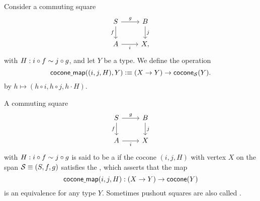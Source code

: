 \begin{defn}
Consider a commuting square
\begin{equation*}
\begin{tikzcd}
S \arrow[d,swap,"f"] \arrow[r,"g"] & B \arrow[d,"j"] \\
A \arrow[r,swap,"i"] & X,
\end{tikzcd}
\end{equation*}
with $H:i\circ f\sim j\circ g$, and let $Y$ be a type. We define the operation
\begin{equation*}
\mathsf{cocone\underline{\ }{}map}((i,j,H),Y) \vcentcolon\equiv (X\to Y) \to \mathsf{cocone}_{\mathcal{S}}(Y).
\end{equation*}
by $h\mapsto (h\circ i,h\circ j,h\cdot H)$. 
\end{defn}

\begin{defn}
A commuting square
\begin{equation*}
\begin{tikzcd}
S \arrow[r,"g"] \arrow[d,swap,"f"] & B \arrow[d,"j"] \\
A \arrow[r,swap,"i"] & X
\end{tikzcd}
\end{equation*}
with $H:i\circ f \sim j\circ g$ is said to be a  if the cocone $(i,j,H)$ with vertex $X$ on the span $\mathcal{S}\equiv (S,f,g)$
satisfies the , which asserts that the map
\begin{equation*}
\mathsf{cocone\underline{\ }{}map}(i,j,H):(X\to Y)\to \mathsf{cocone}(Y)
\end{equation*}
is an equivalence for any type $Y$. Sometimes pushout squares are also called .
\end{defn}

